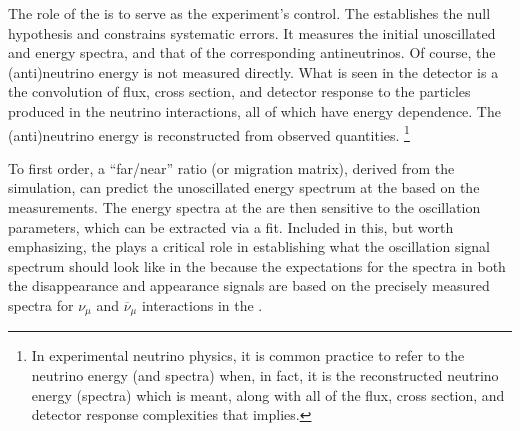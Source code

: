 The role of the  is to serve as the experiment's control. The  establishes the null hypothesis and constrains systematic errors. It measures the initial unoscillated \numu and \nue energy spectra, and that of the corresponding antineutrinos.  Of course, the (anti)neutrino energy is not measured directly.  What is seen in the detector is a the convolution of flux, cross section, and detector response to the particles produced in the neutrino interactions, all of which have energy dependence. The (anti)neutrino energy is reconstructed from observed quantities.  \footnote{In experimental neutrino physics, it is common practice to refer to the neutrino energy (and spectra) when, in fact, it is the reconstructed neutrino energy (spectra) which is meant, along with all of the flux, cross section, and detector response complexities that implies.} 

To first order, a ``far/near'' ratio (or migration matrix), derived from the simulation, can predict the unoscillated energy spectrum at the  based on the  measurements.  The energy spectra at the  are then sensitive to the oscillation parameters, which can be extracted via a fit.  Included in this, but worth emphasizing, the  plays a critical role in establishing what the oscillation signal spectrum should look like in the  because the expectations for the spectra in both the disappearance and appearance signals are based on the precisely measured spectra for $\nu_{\mu}$ and $\overline{\nu}_{\mu}$ interactions in the .

